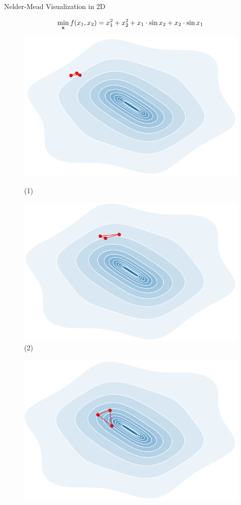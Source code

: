 \documentclass[11pt,compress,t,notes=noshow, xcolor=table]{beamer}
\begin{document}
\begin{vbframe}{Nelder-Mead Visualization in 2D}
\vspace*{-0.5cm}

$$\min_{\mathbf{x}} f(x_1,x_2) = x_1^{2} + x_2^{2} + x_1\cdot \sin x_2 + x_2 \cdot \sin x_1 $$ 
\vspace*{-0.5cm}
\begin{figure}
    \centering
    \begin{minipage}{0.45\textwidth}
        \centering
        \includegraphics[width = 0.6\linewidth]{figure_man/nm_animation2d_1.PNG}
        \caption*{(1)}
    \end{minipage}\hfill
    \begin{minipage}{0.45\textwidth}
        \centering
        \includegraphics[width = 0.6\linewidth]{figure_man/nm_animation2d_2.PNG}
        \caption*{(2)}
    \end{minipage}
\end{figure}
\vspace*{-0.5cm}
\begin{figure}
    \centering
    \begin{minipage}{0.45\textwidth}
        \centering
        \includegraphics[width = 0.6\linewidth]{figure_man/nm_animation2d_3.PNG}

\end{minipage}
\end{figure}
\end{vbframe}
\end{document}
